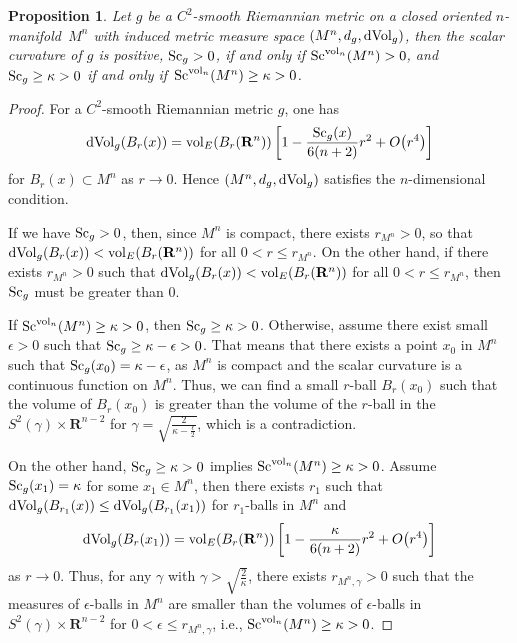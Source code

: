 \documentclass[10pt,a4paper]{amsart}
\newtheorem{Proposition}[Theorem]{Proposition}
\begin{document}
\begin{Proposition}Let $g$ be a $C^2$-smooth Riemannian metric on a closed oriented $n$-mani\-fold~$M^n$ with induced metric measure space $(M^n, d_g, {\rm dVol}_g)$, then the scalar curvature of $g$ is positive, ${\rm Sc}_g> 0$, if and only if ${\rm Sc}^{{\rm vol}_n}(M^n)>0 $, and ${\rm Sc}_g\geq\kappa> 0$ if and only if~${\rm Sc}^{{\rm vol}_n}(M^n)\geq\kappa> 0$.
\end{Proposition}

\begin{proof}For a $C^2$-smooth Riemannian metric $g$, one has
\begin{gather*}
{\rm dVol}_g(B_r(x)) = {\rm vol}_E(B_r(\mathbf{R}^n))\left[1 - \frac{{\rm Sc}_g(x)}{6(n+2)} r^2 + O\big(r^4\big)\right]
 \end{gather*}
for $B_r(x) \subset M^n$ as $r\to 0$. Hence $(M^n, d_g, {\rm dVol}_g)$ satisfies the $n$-dimensional condition.

If we have ${\rm Sc}_g > 0$, then, since $M^n$ is compact, there exists $r_{M^n} > 0$, so that ${\rm dVol}_g(B_r(x))< {\rm vol}_E(B_r(\mathbf{R}^n))$ for all $0<r \leq r_{M^n}$. On the other hand, if there exists $r_{M^n} > 0$ such that ${\rm dVol}_g(B_r(x))< {\rm vol}_E(B_r(\mathbf{R}^n))$ for all $0<r \leq r_{M^n}$, then ${\rm Sc}_g$ must be greater than 0.

If ${\rm Sc}^{{\rm vol}_n}(M^n)\geq\kappa> 0$, then ${\rm Sc}_g \geq \kappa > 0$. Otherwise, assume there exist small $\epsilon>0$ such that ${\rm Sc}_g \geq \kappa-\epsilon>0$. That means that there exists a point $x_0$ in $M^n$ such that ${\rm Sc}_g(x_0)= \kappa-\epsilon$, as $M^n$ is compact and the scalar curvature is a continuous function on $M^n$. Thus, we can find a small $r$-ball $B_r(x_0)$ such that the volume of $B_r(x_0)$ is greater than the volume of the $r$-ball in the $S^2(\gamma)\times \mathbf{R}^{n-2}$ for $\gamma=\sqrt{\frac{2}{\kappa-\frac{\epsilon}{2}}}$, which is a contradiction.

On the other hand, ${\rm Sc}_g\geq\kappa> 0$ implies ${\rm Sc}^{{\rm vol}_n}(M^n)\geq\kappa> 0$. Assume ${\rm Sc}_g(x_1)=\kappa$ for some $x_1\in M^n$, then there exists $r_1$ such that ${\rm dVol}_g(B_{r_1}(x))\leq {\rm dVol}_g(B_{r_1}(x_1))$ for $r_1$-balls in $M^n$ and
\begin{gather*}
 {\rm dVol}_g(B_r(x_1)) = {\rm vol}_E(B_r(\mathbf{R}^n))\left[1 - \frac{\kappa}{6(n+2)} r^2 + O\big(r^4\big)\right]
\end{gather*}
 as $r\to 0$. Thus, for any $\gamma$ with $\gamma> \sqrt{\frac{2}{\kappa}}$, there exists $r_{M^n,\gamma} >0$ such that the measures of $\epsilon$-balls in $M^n$ are smaller than the volumes of $\epsilon$-balls in $S^2(\gamma)\times \mathbf{R}^{n-2}$ for $0 < \epsilon \leq r_{M^n,\gamma}$, i.e., ${\rm Sc}^{{\rm vol}_n}(M^n)\geq\kappa> 0$.
\end{proof}
\end{document}
